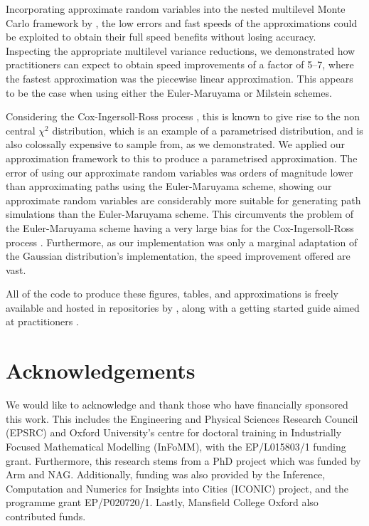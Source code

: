 \documentclass[manuscript,review]{acmart}
\begin{document}
Incorporating approximate random variables into the nested multilevel Monte Carlo framework by \citet{giles2020approximate}, the low errors and fast speeds of the approximations could be exploited to obtain their full speed benefits without losing accuracy. Inspecting the appropriate multilevel variance reductions, we demonstrated how practitioners can expect to obtain speed improvements of a factor of 5--7, where the fastest approximation was the piecewise linear approximation. This appears to be the case when using either the Euler-Maruyama or Milstein schemes. 

Considering the Cox-Ingersoll-Ross process \citep{cox1985theory}, this is known to give rise to the non central $ \chi^2 $ distribution, which is an example of a parametrised distribution, and is also colossally expensive to sample from, as we demonstrated. We applied our approximation framework to this to produce a parametrised approximation. The error of using our approximate random variables was orders of magnitude lower than approximating paths using the Euler-Maruyama scheme, showing our approximate random variables are considerably more suitable for generating path simulations than the Euler-Maruyama scheme. This circumvents the problem of the Euler-Maruyama scheme having a very large bias for the Cox-Ingersoll-Ross process \citep{broadie2006exact}. Furthermore, as our implementation was only a marginal adaptation of the Gaussian distribution's implementation, the speed improvement offered are vast. 

All of the code to produce these figures, tables, and approximations is freely available and hosted in repositories by \citet{sheridan2020approximate_inverse,sheridan2020approximate_random}, along with a getting started guide aimed at practitioners \citep{sheridan2020approximate_random}.

\section{Acknowledgements}

We would like to acknowledge and thank those who have financially sponsored this work. This includes the Engineering and Physical Sciences Research Council (EPSRC) and Oxford University's centre for doctoral training in Industrially Focused Mathematical Modelling (InFoMM), with the EP/L015803/1 funding grant. Furthermore, this research stems from a PhD project \citep{sheridan2020nested} which was funded by Arm and NAG. Additionally, funding was also provided by the Inference, Computation and Numerics for Insights into Cities (ICONIC) project, and the programme grant EP/P020720/1. Lastly, Mansfield College Oxford also contributed funds.  



\end{document}

